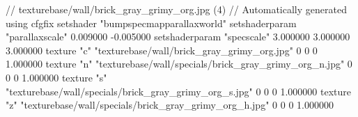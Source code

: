 // texturebase/wall/brick_gray_grimy_org.jpg (4)
// Automatically generated using cfgfix
setshader "bumpspecmapparallaxworld"
setshaderparam "parallaxscale" 0.009000 -0.005000
setshaderparam "specscale" 3.000000 3.000000 3.000000
texture "c" "texturebase/wall/brick_gray_grimy_org.jpg" 0 0 0 1.000000
texture "n" "texturebase/wall/specials/brick_gray_grimy_org_n.jpg" 0 0 0 1.000000
texture "s" "texturebase/wall/specials/brick_gray_grimy_org_s.jpg" 0 0 0 1.000000
texture "z" "texturebase/wall/specials/brick_gray_grimy_org_h.jpg" 0 0 0 1.000000
